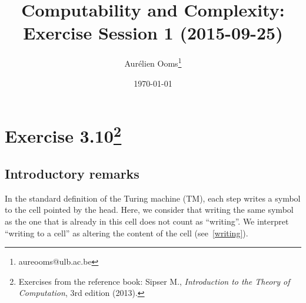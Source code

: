 \documentclass{article}
\title{Computability and Complexity:\\Exercise Session 1 (2015-09-25)}
\author{Aurélien Ooms\footnote{aureooms@ulb.ac.be}}
\date{\today}
\newcommand{\0}{\texttt{\textvisiblespace}}
\newcommand{\°}{\obullet{\0}}
\newcommand{\TM}{TM}
\begin{document}
\maketitle
\tableofcontents

\section{Exercise 3.10\footnote{Exercises from the reference book: Sipser M.,
\emph{Introduction to the Theory of Computation}, 3rd edition (2013).}}

\subsection{Introductory remarks}
In the standard definition of the Turing machine (\TM{}), each step writes a symbol to
the cell pointed by the head. Here, we consider that writing the same symbol as
the one that is already in this cell does not count as ``writing''. We
interpret ``writing to a cell'' as altering the content of the cell
(see~\ref{writing}).
\end{document}
